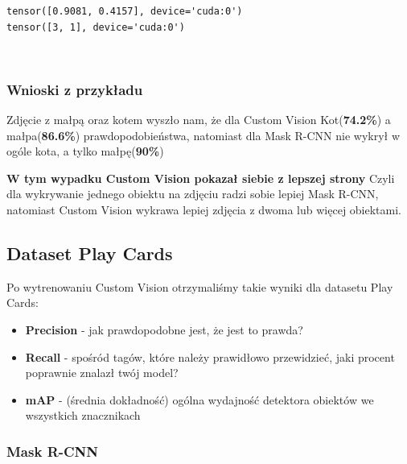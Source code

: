 \documentclass[11pt]{article}
\begin{document}
    \begin{Verbatim}[commandchars=\\\{\}]
tensor([0.9081, 0.4157], device='cuda:0')
tensor([3, 1], device='cuda:0')
    \end{Verbatim}

    \begin{center}
    \end{center}
    { \hspace*{\fill} \\}
    
    \hypertarget{wnioski-z-przykux142adu}{%
\subsubsection{Wnioski z przykładu}\label{wnioski-z-przykux142adu}}

Zdjęcie z małpą oraz kotem wyszło nam, że dla Custom Vision
Kot(\textbf{74.2\%}) a małpa(\textbf{86.6\%}) prawdopodobieństwa,
natomiast dla Mask R-CNN nie wykrył w ogóle kota, a tylko
małpę(\textbf{90\%})

\textbf{W tym wypadku Custom Vision pokazał siebie z lepszej strony}
Czyli dla wykrywanie jednego obiektu na zdjęciu radzi sobie lepiej Mask
R-CNN, natomiast Custom Vision wykrawa lepiej zdjęcia z dwoma lub więcej
obiektami.

    \hypertarget{dataset-play-cards}{%
\subsection{Dataset Play Cards}\label{dataset-play-cards}}

Po wytrenowaniu Custom Vision otrzymaliśmy takie wyniki dla datasetu
Play Cards:
\begin{itemize}
    \item \textbf{Precision} - jak prawdopodobne jest, że jest to
prawda?
\item \textbf{Recall} - spośród tagów, które należy prawidłowo
przewidzieć, jaki procent poprawnie znalazł twój model?
\item \textbf{mAP} -
(średnia dokładność) ogólna wydajność detektora obiektów we wszystkich
znacznikach
\end{itemize}

    \hypertarget{mask-r-cnn}{%
\subsubsection{Mask R-CNN}\label{mask-r-cnn}}
\end{document}
